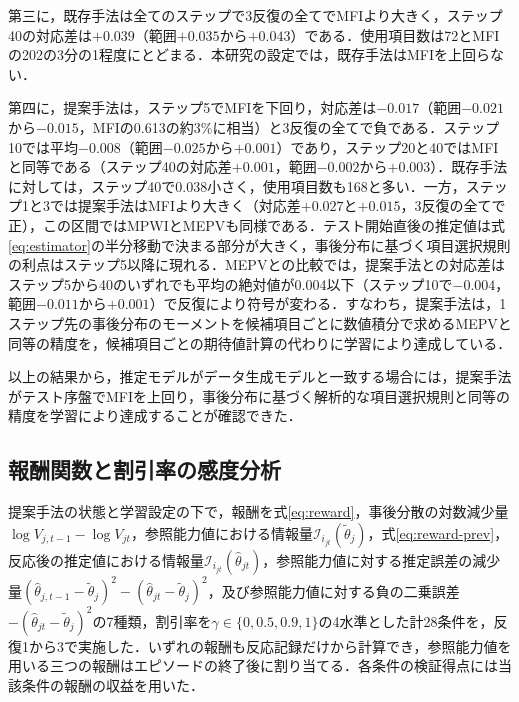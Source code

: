 \documentclass[paper]{ieicej}
\begin{document}
第三に，既存手法は全てのステップで3反復の全てでMFIより大きく，ステップ40の対応差は$+0.039$（範囲$+0.035$から$+0.043$）である．使用項目数は72とMFIの202の3分の1程度にとどまる．本研究の設定では，既存手法はMFIを上回らない．

第四に，提案手法は，ステップ5でMFIを下回り，対応差は$-0.017$（範囲$-0.021$から$-0.015$，MFIの0.613の約3\%に相当）と3反復の全てで負である．ステップ10では平均$-0.008$（範囲$-0.025$から$+0.001$）であり，ステップ20と40ではMFIと同等である（ステップ40の対応差$+0.001$，範囲$-0.002$から$+0.003$）．既存手法に対しては，ステップ40で0.038小さく，使用項目数も168と多い．一方，ステップ1と3では提案手法はMFIより大きく（対応差$+0.027$と$+0.015$，3反復の全てで正），この区間ではMPWIとMEPVも同様である．テスト開始直後の推定値は式\eqref{eq:estimator}の半分移動で決まる部分が大きく，事後分布に基づく項目選択規則の利点はステップ5以降に現れる．MEPVとの比較では，提案手法との対応差はステップ5から40のいずれでも平均の絶対値が0.004以下（ステップ10で$-0.004$，範囲$-0.011$から$+0.001$）で反復により符号が変わる．すなわち，提案手法は，1ステップ先の事後分布のモーメントを候補項目ごとに数値積分で求めるMEPVと同等の精度を，候補項目ごとの期待値計算の代わりに学習により達成している．

以上の結果から，推定モデルがデータ生成モデルと一致する場合には，提案手法がテスト序盤でMFIを上回り，事後分布に基づく解析的な項目選択規則と同等の精度を学習により達成することが確認できた．

\subsection{報酬関数と割引率の感度分析}\label{sec:sensitivity}

提案手法の状態と学習設定の下で，報酬を式\eqref{eq:reward}，事後分散の対数減少量$\log V_{j,t-1}-\log V_{jt}$，参照能力値における情報量$\mathcal{I}_{i_{jt}}(\tilde\theta_j)$，式\eqref{eq:reward-prev}，反応後の推定値における情報量$\mathcal{I}_{i_{jt}}(\hat\theta_{jt})$，参照能力値に対する推定誤差の減少量$(\hat\theta_{j,t-1}-\tilde\theta_j)^2-(\hat\theta_{jt}-\tilde\theta_j)^2$，及び参照能力値に対する負の二乗誤差$-(\hat\theta_{jt}-\tilde\theta_j)^2$の7種類，割引率を$\gamma\in\{0,0.5,0.9,1\}$の4水準とした計28条件を，反復1から3で実施した．いずれの報酬も反応記録だけから計算でき，参照能力値を用いる三つの報酬はエピソードの終了後に割り当てる．各条件の検証得点には当該条件の報酬の収益を用いた．
\end{document}
